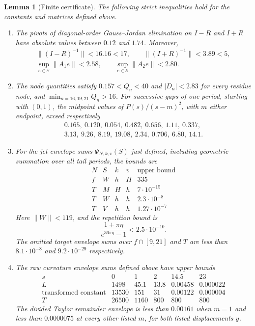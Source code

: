 \documentclass[11pt]{article}
\newtheorem{lemma}[theorem]{Lemma}
\theoremstyle{remark}\newtheorem{remark}[theorem]{Remark}
\begin{document}
\begin{lemma}[Finite certificate]\label{lem:finite-certificate}
The following strict inequalities hold for the constants and matrices
defined above.

\begin{enumerate}
\item The pivots of diagonal-order Gauss--Jordan elimination on $I-R$
and $I+R$ have absolute values between $0.12$ and $1.74$. Moreover,
\[
 \begin{gathered}
 \|(I-R)^{-1}\|<16.16<17,\qquad \|(I+R)^{-1}\|<3.89<5,\\
 \sup_{e\in\mathcal E}\|A_1e\|<2.58,\qquad
 \sup_{e\in\mathcal E}\|A_2e\|<2.80.
 \end{gathered}
\]

\item The node quantities satisfy $0.157<Q_n<40$ and $|D_n|<2.83$
for every residue node, and $\min_{n=16,19,21}Q_n>16$.
For successive gaps of one period, starting with $(0,1)$, the midpoint
values of $P(s)/(s-m)^2$, with $m$ either endpoint, exceed respectively
\[
 \begin{gathered}
 0.165,\ 0.120,\ 0.054,\ 0.482,\ 0.656,\ 1.11,\ 0.337,\\
 3.13,\ 9.26,\ 8.19,\ 19.08,\ 2.34,\ 0.706,\ 6.80,\ 14.1.
 \end{gathered}
\]

\item For the jet envelope sums $\Psi_{N,k,v}(S)$ just defined,
including geometric summation over all tail periods, the bounds are
\[
\begin{array}{c|c|c|c|c}
 N&S&k&v&\text{upper bound}\\\hline
 f&W&h&H&335\\
 T&M&H&h&7\cdot10^{-15}\\
 T&W&h&h&2.3\cdot10^{-8}\\
 T&V&h&h&1.27\cdot10^{-7}
\end{array}
\]
Here $\|W\|<119$, and the repetition bound is
\[
 \frac{1+\pi\eta}{e^{36\pi\eta}-1}<2.5\cdot10^{-10}.
\]
The omitted target envelope sums over $f\cap[9,21]$ and $T$
are less than $8.1\cdot10^{-8}$ and $9.2\cdot10^{-29}$ respectively.

\item The raw curvature envelope sums defined above have upper bounds
\[
\begin{array}{c|rrrrr}
 s&0&1&2&14.5&23\\\hline
 L&1498&45.1&13.8&0.00458&0.000022\\
 \text{transformed constant}&13530&151&31&0.00122&0.000004\\
 T&26500&1160&800&800&800
\end{array}
\]
The divided Taylor remainder envelope is less than $0.00161$ when
$m=1$ and less than $0.0000075$ at every other listed $m$, for both
listed displacements $y$.


\end{enumerate}
\end{lemma}
\end{document}
